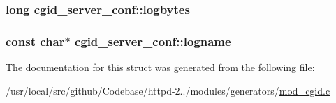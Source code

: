 \subsubsection[{\texorpdfstring{logbytes}{logbytes}}]{\setlength{\rightskip}{0pt plus 5cm}long cgid\+\_\+server\+\_\+conf\+::logbytes}\hypertarget{structcgid__server__conf_a39b1cb84906f007e785a3de43d2ae058}{}\label{structcgid__server__conf_a39b1cb84906f007e785a3de43d2ae058}
\subsubsection[{\texorpdfstring{logname}{logname}}]{\setlength{\rightskip}{0pt plus 5cm}const char$\ast$ cgid\+\_\+server\+\_\+conf\+::logname}\hypertarget{structcgid__server__conf_a43a8a3c8e3043f225994110acb890f86}{}\label{structcgid__server__conf_a43a8a3c8e3043f225994110acb890f86}


The documentation for this struct was generated from the following file\+:\begin{DoxyCompactItemize}
\item 
/usr/local/src/github/\+Codebase/httpd-\/2../modules/generators/\hyperlink{mod__cgid_8c}{mod\+\_\+cgid.\+c}\end{DoxyCompactItemize}
